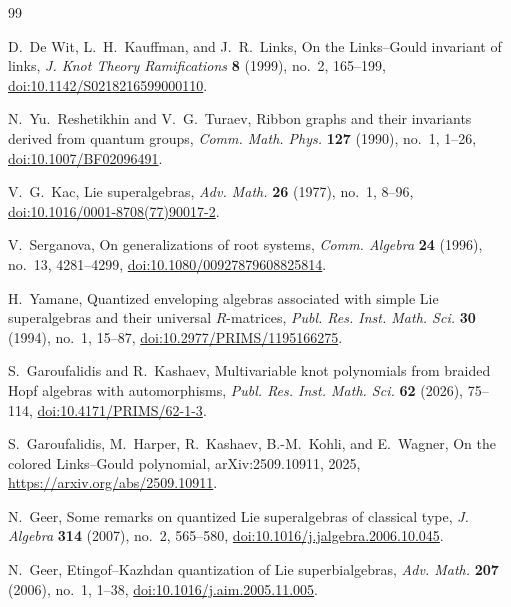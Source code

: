 \documentclass[11pt,a4paper]{article}
\theoremstyle{definition}
\theoremstyle{remark}
\begin{document}
\begin{thebibliography}{99}
\raggedright

D.~De Wit, L.~H.~Kauffman, and J.~R.~Links,
\newblock On the Links--Gould invariant of links,
\newblock \emph{J. Knot Theory Ramifications} \textbf{8} (1999), no.~2,
165--199,
\newblock \href{https://doi.org/10.1142/S0218216599000110}
{doi:10.1142/S0218216599000110}.

N.~Yu.~Reshetikhin and V.~G.~Turaev,
\newblock Ribbon graphs and their invariants derived from quantum groups,
\newblock \emph{Comm. Math. Phys.} \textbf{127} (1990), no.~1, 1--26,
\newblock \href{https://doi.org/10.1007/BF02096491}
{doi:10.1007/BF02096491}.

V.~G.~Kac,
\newblock Lie superalgebras,
\newblock \emph{Adv. Math.} \textbf{26} (1977), no.~1, 8--96,
\newblock \href{https://doi.org/10.1016/0001-8708(77)90017-2}
{doi:10.1016/0001-8708(77)90017-2}.

V.~Serganova,
\newblock On generalizations of root systems,
\newblock \emph{Comm. Algebra} \textbf{24} (1996), no.~13, 4281--4299,
\newblock \href{https://doi.org/10.1080/00927879608825814}
{doi:10.1080/00927879608825814}.

H.~Yamane,
\newblock Quantized enveloping algebras associated with simple Lie
superalgebras and their universal \(R\)-matrices,
\newblock \emph{Publ. Res. Inst. Math. Sci.} \textbf{30} (1994), no.~1,
15--87,
\newblock \href{https://doi.org/10.2977/PRIMS/1195166275}
{doi:10.2977/PRIMS/1195166275}.

S.~Garoufalidis and R.~Kashaev,
\newblock Multivariable knot polynomials from braided Hopf algebras with
automorphisms,
\newblock \emph{Publ. Res. Inst. Math. Sci.} \textbf{62} (2026), 75--114,
\newblock \href{https://doi.org/10.4171/PRIMS/62-1-3}
{doi:10.4171/PRIMS/62-1-3}.

S.~Garoufalidis, M.~Harper, R.~Kashaev, B.-M.~Kohli, and E.~Wagner,
\newblock On the colored Links--Gould polynomial,
\newblock arXiv:2509.10911, 2025,
\newblock \url{https://arxiv.org/abs/2509.10911}.

N.~Geer,
\newblock Some remarks on quantized Lie superalgebras of classical type,
\newblock \emph{J. Algebra} \textbf{314} (2007), no.~2, 565--580,
\newblock \href{https://doi.org/10.1016/j.jalgebra.2006.10.045}
{doi:10.1016/j.jalgebra.2006.10.045}.

N.~Geer,
\newblock Etingof--Kazhdan quantization of Lie superbialgebras,
\newblock \emph{Adv. Math.} \textbf{207} (2006), no.~1, 1--38,
\newblock \href{https://doi.org/10.1016/j.aim.2005.11.005}
{doi:10.1016/j.aim.2005.11.005}.


\end{thebibliography}
\end{document}
